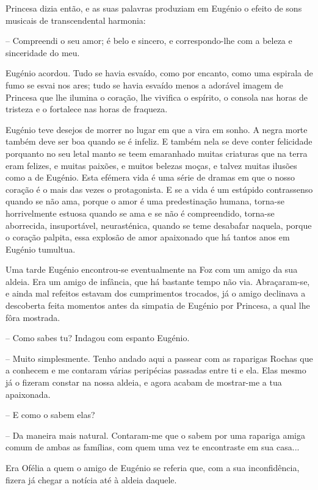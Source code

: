 \documentclass[9pt]{article}
\begin{document}
Princesa dizia então, e as suas palavras produziam em Eugé\-nio o efeito de sons musicais de transcendental harmonia:

-- Compreendi o seu amor; é belo e sincero, e correspondo-\-lhe com a beleza e sinceridade do meu.

Eugé\-nio acordou. Tudo se havia esvaído, como por encanto, como uma
espirala de fumo se esvai nos ares; tudo se havia esvaído menos a adorável imagem de Princesa que lhe ilumina o cora\-ção, lhe vivifi\-ca o espírito,
o consola nas horas de tristeza e o fortalece nas horas de fraqueza.

Eugé\-nio teve desejos de morrer no lugar em que a vira em sonho. A
negra morte também deve ser boa quan\-do se é infeliz. E também nela se
deve conter felicidade porquanto no seu letal manto se teem emaranhado
muitas criaturas que na terra eram felizes, e muitas paixões, e muitos
belezas moças, e talvez muitas ilusões como a de Eugé\-nio. Esta efémera
vida é uma série de dramas em que o nosso cora\-ção é o mais das vezes o
protagonista. E se a vida é um estúpido contrassenso quan\-do se não ama,
porque o amor é uma predestina\-ção humana, {torna-se} horrivelmente estuosa %
quan\-do se ama e se não é compreendido, \mbox{torna-se} aborrecida, insuportável,
neurasténica, quan\-do se teme desabafar naquela, porque o cora\-ção palpita,
essa explosão de amor apaixonado que há tantos anos em Eugé\-nio tumultua.

Uma tarde Eugé\-nio encontrou-se eventualmente na Foz com um amigo da
sua aldeia. Era um amigo de infância, que há bastante tempo não via. Abraçaram-se, e ainda mal refeitos estavam dos cumprimentos trocados, já o
amigo declinava a descoberta feita momentos antes da simpatia de Eugé\-nio
por Princesa, a qual lhe fôra mostrada.

-- Como sabes tu? Indagou com espanto Eugé\-nio.

-- Muito simplesmente. Tenho andado aqui a passear com as raparigas
Rochas que a conhecem e me contaram várias peripécias passadas entre ti
e ela. Elas mesmo já o fizeram constar na nossa aldeia, e agora acabam de
mostrar-me a tua apaixonada.

-- E como o sabem elas?

-- Da maneira mais natural. Contaram-me que o sabem por uma rapariga
amiga comum de ambas as fa\-mí\-lias, com quem uma vez te encontraste em sua
casa...

Era Ofélia a quem o amigo de Eugé\-nio se referia que, com a sua inconfidên\-cia, fizera já chegar a notícia até à aldeia daquele.
\end{document}

